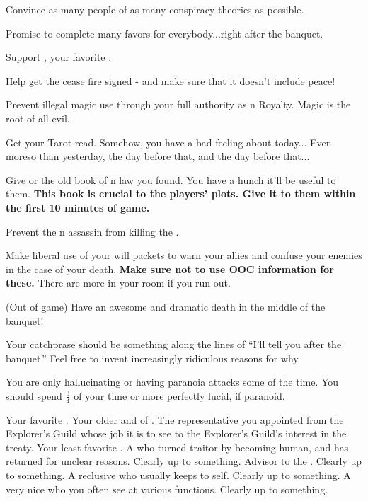 \documentclass[char]{NeptuneBall}
\begin{document}
\begin{itemz}[Goals]
  \item Convince as many people of as many conspiracy theories as possible.
	\item Promise to complete many favors for everybody...right after the banquet.
  \item Support \cPrincess{}, your favorite \cPrincess{\nephew}.
  \item Help \cKing{} get the cease fire signed - and make sure that it doesn't include peace!
	\item Prevent illegal magic use through your full authority as \pAtlantis{}n Royalty. Magic is the root of all evil.
	\item Get your Tarot read. Somehow, you have a bad feeling about today... Even moreso than yesterday, the day before that, and the day before that...
	\item Give \cPrincess{} or \cDiplomat{} the old book of \pPacifica{}n law you found. You have a hunch it'll be useful to them. {\bf This book is crucial to the players' plots. Give it to them within the first 10 minutes of game.}
	\item Prevent the \pPacifica{}n assassin from killing the \cKing{\King}.
	\item Make liberal use of your will packets to warn your allies and confuse your enemies in the case of your death. {\bf Make sure not to use OOC information for these.} There are more in your room if you run out.
	\item (Out of game) Have an awesome and dramatic death in the middle of the banquet!
\end{itemz}

\begin{itemz}[Notes]
  \item Your catchprase should be something along the lines of ``I'll tell you after the banquet.'' Feel free to invent increasingly ridiculous reasons for why.
  \item You are only hallucinating or having paranoia attacks some of the time. You should spend $\frac{3}{4}$ of your time or more perfectly lucid, if paranoid.
\end{itemz}

\begin{contacts}
  \contact{\cPrincess{}} Your favorite \cPrincess{\nephew}.
  \contact{\cKing{}} Your older \cKing{\sibling} and \cKing{\King} of \pAtlantis{}.
  \contact{\cPriest{}} The representative you appointed from the Explorer's Guild whose job it is to see to the Explorer's Guild's interest in the treaty.
	\contact{\cAriel{}} Your least favorite \cAriel{\nephew}. A \cAriel{\mer} who turned traitor by becoming human, and has returned for unclear reasons. Clearly up to something.
	\contact{\cManta{}} Advisor to the \cKing{\King}. Clearly up to something.
	\contact{\cQueen{}} A reclusive \cQueen{\mer} who usually keeps to \cQueen{\their}self. Clearly up to something.
	\contact{\cWitch{}} A very nice \cWitch{\mer} who you often see at various functions. Clearly up to something.
\end{contacts}
\end{document}
